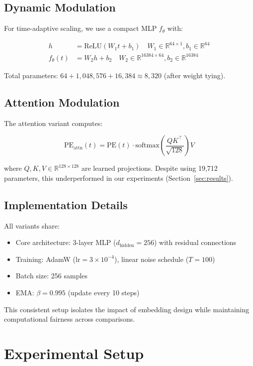 \documentclass{article} %
\begin{document}
\subsection{Dynamic Modulation}
For time-adaptive scaling, we use a compact MLP $f_\theta$ with:

\begin{align}
    h &= \text{ReLU}(W_1 t + b_1) \quad W_1\in\mathbb{R}^{64\times1}, b_1\in\mathbb{R}^{64} \\
    f_\theta(t) &= W_2 h + b_2 \quad W_2\in\mathbb{R}^{16384\times64}, b_2\in\mathbb{R}^{16384}
\end{align}

Total parameters: $64 + 1,\!048,\!576 + 16,\!384 \approx 8,\!320$ (after weight tying).

\subsection{Attention Modulation}
The attention variant computes:

\begin{equation}
    \text{PE}_{\text{attn}}(t) = \text{PE}(t)\cdot\text{softmax}\left(\frac{QK^\top}{\sqrt{128}}\right)V
\end{equation}

where $Q,K,V\in\mathbb{R}^{128\times128}$ are learned projections. Despite using 19,712 parameters, this underperformed in our experiments (Section~\ref{sec:results}).

\subsection{Implementation Details}
All variants share:
\begin{itemize}
    \item Core architecture: 3-layer MLP ($d_{\text{hidden}}=256$) with residual connections
    \item Training: AdamW ($\text{lr}=3\times10^{-4}$), linear noise schedule ($T=100$)
    \item Batch size: 256 samples
    \item EMA: $\beta=0.995$ (update every 10 steps)
\end{itemize}

This consistent setup isolates the impact of embedding design while maintaining computational fairness across comparisons.

\section{Experimental Setup}
\label{sec:experimental}
\end{document}
